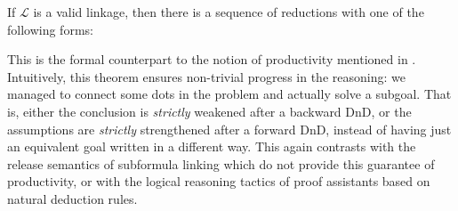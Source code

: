 \begin{theorem}[Productivity]
If $\mathcal{L}$ is a valid linkage, then there
is a sequence of reductions with one of the following forms:
\end{theorem}

This is the formal counterpart to the notion of productivity mentioned in
. Intuitively, this theorem ensures non-trivial progress in the
reasoning: we managed to connect some dots in the problem and actually solve a
subgoal. That is, either the conclusion is \emph{strictly} weakened after a
backward DnD, or the assumptions are \emph{strictly} strengthened after a
forward DnD, instead of having just an equivalent goal written in a different
way. This again contrasts with the
release semantics of subformula linking which do not provide this guarantee of
productivity, or with the logical reasoning tactics of proof assistants based on
natural deduction rules.




